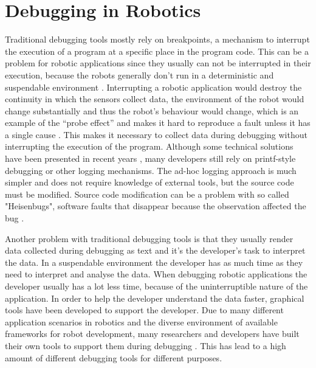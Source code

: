 \chapter{Debugging in Robotics}


Traditional debugging tools mostly rely on breakpoints, a mechanism to interrupt the execution of a program at a specific place in the program code. This can be a problem for robotic applications since they usually can not be interrupted in their execution, because the robots generally don't run in a deterministic and suspendable environment \cite{Gumbley2009}. Interrupting a robotic application would destroy the continuity in which the sensors collect data, the environment of the robot would change substantially and thus the robot's behaviour would change, which is an example of the ``probe effect'' and makes it hard to reproduce a fault unless it has a single cause \cite{Gumbley2009}. This makes it necessary to collect data during debugging without interrupting the execution of the program.
Although some technical solutions have been presented in recent years \cite{Gumbley2009}, many developers still rely on printf-style debugging or other logging mechanisms. The ad-hoc logging approach is much simpler and does not require knowledge of external tools, but the source code must be modified. Source code modification can be a problem with so called "Heisenbugs", software faults that disappear because the observation affected the bug \cite{Grottke2005}.

Another problem with traditional debugging tools is that they usually render data collected during debugging as text and it's the developer's task to interpret the data. In a suspendable environment the developer has as much time as they need to interpret and analyse the data. When debugging robotic applications the developer usually has a lot less time, because of the uninterruptible nature of the application. In order to help the developer understand the data faster, graphical tools have been developed to support the developer. Due to many different application scenarios in robotics and the diverse environment of available frameworks for robot development, many researchers and developers have built their own tools to support them during debugging \cite{Collett2010}. This has lead to a high amount of different debugging tools for different purposes.

